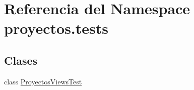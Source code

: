 \hypertarget{namespaceproyectos_1_1tests}{}\section{Referencia del Namespace proyectos.\+tests}
\label{namespaceproyectos_1_1tests}
\subsection*{Clases}
\begin{DoxyCompactItemize}
\item 
class \hyperlink{classproyectos_1_1tests_1_1_proyectos_views_test}{Proyectos\+Views\+Test}
\end{DoxyCompactItemize}

